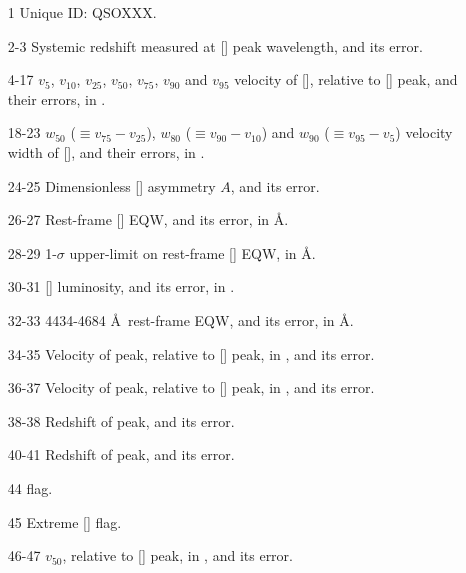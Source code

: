 \begin{itemize}

    
  \item[1] Unique ID: QSOXXX.

  \item[2-3] Systemic redshift measured at [] peak wavelength, and its error. 

  \item[4-17] $v_{5}$, $v_{10}$, $v_{25}$, $v_{50}$, $v_{75}$, $v_{90}$ and $v_{95}$ velocity of [], relative to [] peak, and their errors, in \kms.  

  \item[18-23] $w_{50}$ ($\equiv v_{75} - v_{25}$), $w_{80}$ ($\equiv v_{90} - v_{10}$) and $w_{90}$ ($\equiv v_{95} - v_{5}$) velocity width of [], and their errors, in \kms.

  \item[24-25] Dimensionless [] asymmetry $A$, and its error.

  \item[26-27] Rest-frame [] EQW, and its error, in \AA.

  \item[28-29] 1-$\sigma$ upper-limit on rest-frame [] EQW, in \AA. %

  \item[30-31] [\ion{O}{III}] luminosity, and its error, in \ergs. 

  \item[32-33] 4434-4684 \AA\, rest-frame  EQW, and its error, in \AA. %

  \item[34-35] Velocity of \hb peak, relative to [] peak, in \kms, and its error. 

  \item[36-37] Velocity of \ha peak, relative to [] peak, in \kms, and its error. 

  \item[38-38] Redshift of \hb peak, and its error.

  \item[40-41] Redshift of \ha peak, and its error.

  \item[44]  flag. 

  \item[45] Extreme [] flag.   

  \item[46-47]  $v_{50}$, relative to [] peak, in \kms, and its error.

\end{itemize}

